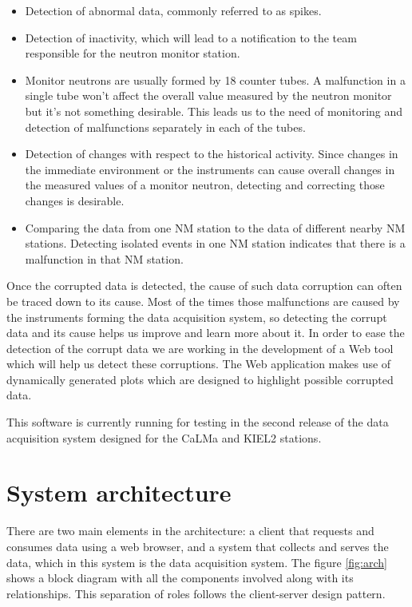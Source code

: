 \documentclass[a4paper]{jpconf}
\begin{document}
\begin{itemize}
	\item   Detection of abnormal data, commonly referred to as spikes.
    \item   Detection of inactivity, which will lead to a notification to the
        team responsible for the neutron monitor station.
    \item   Monitor neutrons are usually formed by 18 counter tubes. A
        malfunction in a single tube won't affect the overall value measured by
        the neutron monitor but it's not something desirable. This leads us to
        the need of monitoring and detection of malfunctions separately in each
        of the tubes.  
    \item	Detection of changes with respect to the historical activity.
        Since changes in the immediate environment or the instruments can cause
        overall changes in the measured values of a monitor neutron, detecting
        and correcting those changes is desirable.
    \item 	Comparing the data from one NM station to the data of different
        nearby NM stations. Detecting isolated events in one NM station
        indicates that there is a malfunction in that NM station.	
\end{itemize}

Once the corrupted data is detected, the cause of such data corruption can often 
be traced down to its cause. Most of the times those malfunctions are caused by the instruments
forming the data acquisition system, so detecting the corrupt data and its cause
helps us improve and learn more about it. In order
to ease the detection of the corrupt data we are working in the
development of a Web tool which will help us detect these corruptions. The Web
application makes use of dynamically generated plots which are designed to highlight
possible corrupted data.

This software is currently running for testing in the second release of the data
acquisition system\cite{Garcia2014} designed for the CaLMa\cite{Medina2013} and
KIEL2 stations.


\section{System architecture}

There are two main elements in the architecture: a client that requests and
consumes data using a web browser, and a system that collects and serves the
data, which in this system is the data acquisition system. The figure
\ref{fig:arch} shows a block diagram with all the components involved along with
its relationships. This separation of roles follows the client-server design
pattern\cite{wiki:ClientServer}.
\end{document}
